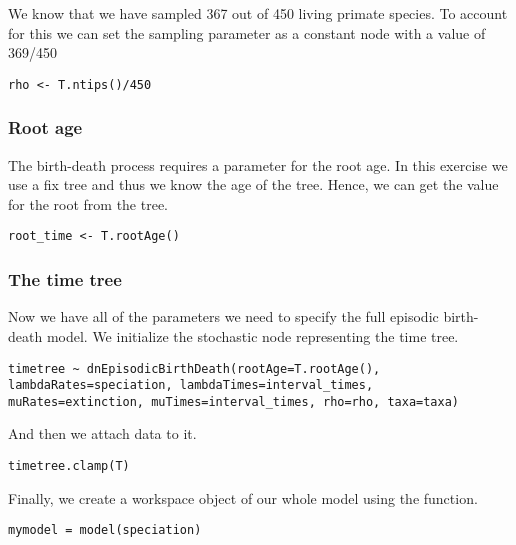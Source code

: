 We know that we have sampled 367 out of 450 living primate species. 
To account for this we can set the sampling parameter as a constant node with a value of 369/450
{\tt \begin{snugshade*}
\begin{lstlisting}
rho <- T.ntips()/450
\end{lstlisting}
\end{snugshade*}}


\subsubsection{Root age}

The birth-death process requires a parameter for the root age.
In this exercise we use a fix tree and thus we know the age of the tree.
Hence, we can get the value for the root from the \citet{Springer2012} tree.
{\tt \begin{snugshade*}
\begin{lstlisting}
root_time <- T.rootAge()
\end{lstlisting}
\end{snugshade*}}

\subsubsection{The time tree}

Now we have all of the parameters we need to specify the full episodic birth-death model. 
We initialize the stochastic node representing the time tree.
{\tt \begin{snugshade*}
\begin{lstlisting}
timetree ~ dnEpisodicBirthDeath(rootAge=T.rootAge(), lambdaRates=speciation, lambdaTimes=interval_times, muRates=extinction, muTimes=interval_times, rho=rho, taxa=taxa)
\end{lstlisting}
\end{snugshade*}}
And then we attach data to it.
{\tt \begin{snugshade*}
\begin{lstlisting}
timetree.clamp(T)
\end{lstlisting}
\end{snugshade*}}

Finally, we create a workspace object of our whole model using the  function. 
{\tt \begin{snugshade*}
\begin{lstlisting}
mymodel = model(speciation)
\end{lstlisting}
\end{snugshade*}}

